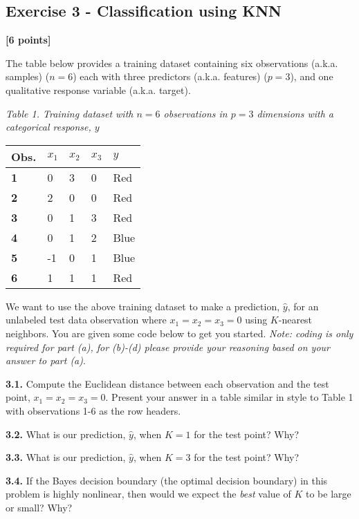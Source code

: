 \documentclass[
  letterpaper,
  DIV=11,
  numbers=noendperiod]{scrartcl}
\begin{document}
\subsection{Exercise 3 - Classification using
KNN}\label{exercise-3---classification-using-knn}

\textbf{{[}6 points{]}}

The table below provides a training dataset containing six observations
(a.k.a. samples) (\(n=6\)) each with three predictors (a.k.a. features)
(\(p=3\)), and one qualitative response variable (a.k.a. target).

\emph{Table 1. Training dataset with \(n=6\) observations in \(p=3\)
dimensions with a categorical response, \(y\)}

\begin{longtable}[]{@{}lllll@{}}
\toprule\noalign{}
Obs. & \(x_1\) & \(x_2\) & \(x_3\) & \(y\) \\
\midrule\noalign{}
\endhead
\bottomrule\noalign{}
\endlastfoot
\textbf{1} & 0 & 3 & 0 & Red \\
\textbf{2} & 2 & 0 & 0 & Red \\
\textbf{3} & 0 & 1 & 3 & Red \\
\textbf{4} & 0 & 1 & 2 & Blue \\
\textbf{5} & -1 & 0 & 1 & Blue \\
\textbf{6} & 1 & 1 & 1 & Red \\
\end{longtable}

We want to use the above training dataset to make a prediction,
\(\hat{y}\), for an unlabeled test data observation where
\(x_1=x_2=x_3=0\) using \(K\)-nearest neighbors. You are given some code
below to get you started. \emph{Note: coding is only required for part
(a), for (b)-(d) please provide your reasoning based on your answer to
part (a)}.

\textbf{3.1.} Compute the Euclidean distance between each observation
and the test point, \(x_1=x_2=x_3=0\). Present your answer in a table
similar in style to Table 1 with observations 1-6 as the row headers.

\textbf{3.2.} What is our prediction, \(\hat{y}\), when \(K=1\) for the
test point? Why?

\textbf{3.3.} What is our prediction, \(\hat{y}\), when \(K=3\) for the
test point? Why?

\textbf{3.4.} If the Bayes decision boundary (the optimal decision
boundary) in this problem is highly nonlinear, then would we expect the
\emph{best} value of \(K\) to be large or small? Why?
\end{document}
